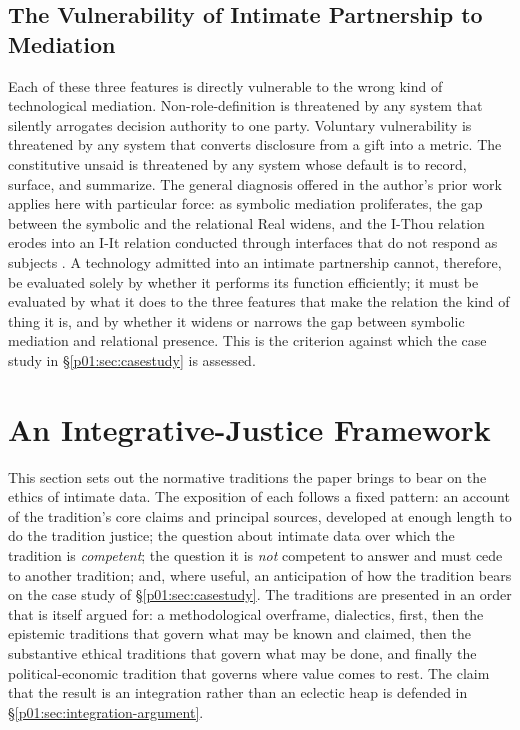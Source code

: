 \documentclass[11pt,a4paper]{article}
\begin{document}
\subsection{The Vulnerability of Intimate Partnership to Mediation}

Each of these three features is directly vulnerable to the wrong kind of technological mediation. Non-role-definition is threatened by any system that silently arrogates decision authority to one party. Voluntary vulnerability is threatened by any system that converts disclosure from a gift into a metric. The constitutive unsaid is threatened by any system whose default is to record, surface, and summarize. The general diagnosis offered in the author's prior work applies here with particular force: as symbolic mediation proliferates, the gap between the symbolic and the relational Real widens, and the I-Thou relation erodes into an I-It relation conducted through interfaces that do not respond as subjects \parencite{huang2025relational, buber1937iandthou}. A technology admitted into an intimate partnership cannot, therefore, be evaluated solely by whether it performs its function efficiently; it must be evaluated by what it does to the three features that make the relation the kind of thing it is, and by whether it widens or narrows the gap between symbolic mediation and relational presence. This is the criterion against which the case study in §\ref{p01:sec:casestudy} is assessed.

\section{An Integrative-Justice Framework}\label{p01:sec:frameworks}

This section sets out the normative traditions the paper brings to bear on the ethics of intimate data. The exposition of each follows a fixed pattern: an account of the tradition's core claims and principal sources, developed at enough length to do the tradition justice; the question about intimate data over which the tradition is \emph{competent}; the question it is \emph{not} competent to answer and must cede to another tradition; and, where useful, an anticipation of how the tradition bears on the case study of §\ref{p01:sec:casestudy}. The traditions are presented in an order that is itself argued for: a methodological overframe, dialectics, first, then the epistemic traditions that govern what may be known and claimed, then the substantive ethical traditions that govern what may be done, and finally the political-economic tradition that governs where value comes to rest. The claim that the result is an integration rather than an eclectic heap is defended in §\ref{p01:sec:integration-argument}.
\end{document}
